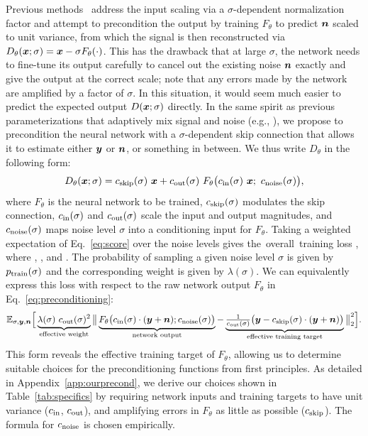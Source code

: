 \documentclass{article}
\begin{document}
Previous methods~\cite{Nichol2021a,Song2020ddim,Song2021sde} address the input scaling via a $\sigma$-dependent normalization factor and
  attempt to precondition the output by training $F_\theta$ to predict $\boldsymbol{n}$ scaled to unit variance,
  from which the signal is then reconstructed via $D_\theta(\boldsymbol{x};\sigma) = \boldsymbol{x}-\sigma F_\theta(\cdot)$.
This has the drawback that at large $\sigma$, the network needs to fine-tune its output carefully to cancel out the existing noise $\boldsymbol{n}$ exactly and give the output at the correct scale;
  note that any errors made by the network are amplified by a factor of $\sigma$.
In this situation, it would seem much easier to predict the expected output $D(\boldsymbol{x}; \sigma)$ directly.
{In the same spirit as previous parameterizations that adaptively mix signal and noise (e.g., \cite{Dockhorn2022damped,Salimans2022,Vahdat2021}), }%
we propose to precondition the neural network with a $\sigma$-dependent skip connection that allows it to estimate either $\boldsymbol{y}$ or $\boldsymbol{n}$, or something in between.
We thus write $D_\theta$ in the following form:
\begin{equation}
D_\theta(\boldsymbol{x}; \sigma) = c_\text{skip}(\sigma) ~\boldsymbol{x} + c_\text{out}(\sigma) ~F_\theta \big( c_\text{in}(\sigma) ~\boldsymbol{x}; ~c_\text{noise}(\sigma) \big) \text{,}
\label{eq:preconditioning}
\end{equation}
where $F_\theta$ is the neural network to be trained,
  $c_\text{skip}(\sigma)$ modulates the skip connection,
  $c_\text{in}(\sigma)$ and $c_\text{out}(\sigma)$ scale the input and output magnitudes, and
  $c_\text{noise}(\sigma)$ maps noise level $\sigma$ into a conditioning input for $F_\theta$.
Taking a weighted expectation of Eq.~\ref{eq:score} over the noise levels gives \mbox{the overall training} loss
  ,
  where \smash{$\sigma \sim \ptrain$}, \smash{$\signal \sim \pdata$}, and .
The probability of sampling a given noise level $\sigma$ is given by $p_\text{train}(\sigma)$ and the corresponding weight is given by $\lambda(\sigma)$.
We can equivalently express this loss with respect to the raw network output $F_\theta$ in Eq.~\ref{eq:preconditioning}:
\begin{equation}
  \mathbb{E}_{\sigma, \boldsymbol{y}, \boldsymbol{n}} \Big[
    \underbrace{\lambda(\sigma) ~ c_\text{out}(\sigma)^2}_{\text{effective weight}}
    \big\Vert
      \underbrace{F_\theta \big( c_\text{in}(\sigma) \cdot (\boldsymbol{y} + \boldsymbol{n}); c_\text{noise}(\sigma) \big)}_{\text{network output}} -
      \underbrace{\tfrac{1}{c_\text{out}(\sigma)} \big(\boldsymbol{y} - c_\text{skip}(\sigma) \cdot (\boldsymbol{y} + \boldsymbol{n}) \big)}_{\text{effective training target}}
    \big\Vert^2_2 \Big] \text{.}
  \label{eq:precloss}
\end{equation}
This form reveals the effective training target of $F_\theta$, allowing us to determine suitable choices for the preconditioning functions from first principles.
As detailed in Appendix~{\ref{app:ourprecond}}, we derive our choices shown in Table~\ref{tab:specifics} by
  requiring network inputs and training targets to have unit variance ($c_\text{in}$, $c_\text{out}$),
  and amplifying errors in $F_\theta$ as little as possible ($c_\text{skip}$).
The formula for $c_\text{noise}$ is chosen empirically.
\end{document}

